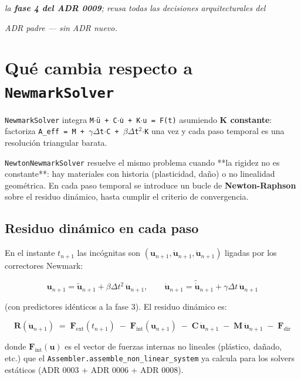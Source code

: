 \documentclass[11pt,letterpaper,oneside]{report}
\begin{document}
\textit{la \textbf{fase 4 del ADR 0009}; reusa todas las decisiones arquitecturales del}

\textit{ADR padre --- sin ADR nuevo.}



\section{Qué cambia respecto a \texttt{NewmarkSolver}}

\texttt{NewmarkSolver} integra \texttt{M\ensuremath{\cdot}ü + C\ensuremath{\cdot}u̇ + K\ensuremath{\cdot}u = F(t)} asumiendo \textbf{K constante}:
factoriza \texttt{A\_eff = M + \ensuremath{\gamma}\ensuremath{\Delta}t\ensuremath{\cdot}C + \ensuremath{\beta}\ensuremath{\Delta}t\ensuremath{^{2}}\ensuremath{\cdot}K} una vez y cada paso temporal es una
resolución triangular barata.

\texttt{NewtonNewmarkSolver} resuelve el mismo problema cuando **la rigidez no es
constante**: hay materiales con historia (plasticidad, daño) o no linealidad
geométrica. En cada paso temporal se introduce un bucle de \textbf{Newton-Raphson}
sobre el residuo dinámico, hasta cumplir el criterio de convergencia.

\subsection{Residuo dinámico en cada paso}

En el instante $t_{n+1}$ las incógnitas son $(\mathbf u_{n+1}, \dot{\mathbf u}_{n+1}, \ddot{\mathbf u}_{n+1})$
ligadas por los correctores Newmark:

\[
\mathbf u_{n+1} = \tilde{\mathbf u}_{n+1} + \beta\Delta t^2\,\ddot{\mathbf u}_{n+1}, \qquad
  \dot{\mathbf u}_{n+1} = \tilde{\dot{\mathbf u}}_{n+1} + \gamma\Delta t\,\ddot{\mathbf u}_{n+1}
\]

(con predictores idénticos a la fase 3). El residuo dinámico es:

\[
\mathbf R(\ddot{\mathbf u}_{n+1}) \;=\; \mathbf F_\text{ext}(t_{n+1}) \;-\; \mathbf F_\text{int}(\mathbf u_{n+1}) \;-\; \mathbf C\,\dot{\mathbf u}_{n+1} \;-\; \mathbf M\,\ddot{\mathbf u}_{n+1} \;-\; \mathbf F_\text{dir}
\]

donde $\mathbf F_\text{int}(\mathbf u)$ es el vector de fuerzas internas no lineales
(plástico, dañado, etc.) que el \texttt{Assembler.assemble\_non\_linear\_system} ya
calcula para los solvers estáticos (ADR 0003 + ADR 0006 + ADR 0008).
\end{document}

